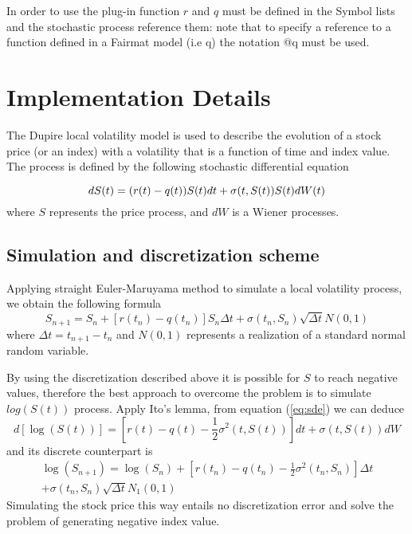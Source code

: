 In order to use the plug-in function $r$ and $q$ must be defined in the Symbol lists and the stochastic process reference them: note that to specify a reference to a function defined in a Fairmat model (i.e {\ttfamily q}) the notation {\ttfamily @q} must be used. 

\section{Implementation Details}

The Dupire local volatility model is used to describe the evolution of a stock price (or an index) with a volatility that is a function of time and index value. The process is defined by the following stochastic differential equation

\begin{equation}
dS(t) = (r(t)-q(t)) S(t)dt + \sigma(t,S(t))S(t)dW(t)\label{eq:sde}\\
\end{equation}
where $S$ represents the price process, and $dW$ is a Wiener processes.

\subsection{Simulation and discretization scheme}

Applying straight Euler-Maruyama method to simulate a local volatility process, we obtain the following formula
\begin{equation}
S_{n+1} = S_n + [r(t_n) - q(t_n)]S_n\Delta t + \sigma(t_n,S_n)\sqrt{\Delta t} N(0,1)
\end{equation}
where $\Delta t = t_{n+1}-t_n$ and $N(0,1)$ represents a realization of a standard normal random variable. 

By using the discretization described above it is possible for $S$ to reach negative values, therefore  the best approach to overcome the problem is to simulate $log(S(t))$ process. Apply Ito's lemma, from equation (\ref{eq:sde}) we can deduce
\begin{equation}
d\left[\log\left(S(t)\right)\right] = \left[r(t) - q(t)- \frac{1}{2}\sigma^2(t, S(t)) \right]dt + \sigma(t, S(t))dW %
\end{equation}
and its discrete counterpart is
\begin{align}
\log(S_{n+1}) = \log(S_n) + \left[r(t_n) - q(t_n) - \frac{1}{2}\sigma^2(t_n, S_n) \right]\Delta t\nonumber\\
 + \sigma(t_n, S_n)\sqrt{\Delta t} N_1(0,1)
\end{align}
Simulating the stock price this way entails no discretization error and solve the problem of generating negative index value.

